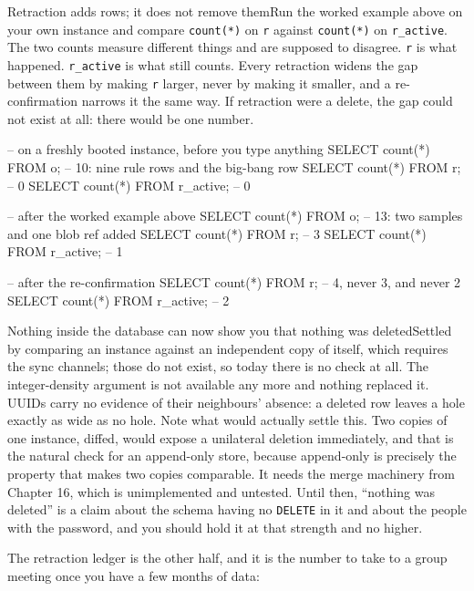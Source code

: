 \begin{Correspondence}{Retraction adds rows; it does not remove them}{Run the worked example above on your own instance and compare \texttt{count(*)} on \texttt{r} against \texttt{count(*)} on \texttt{r\_active}.}
The two counts measure different things and are supposed to disagree. \texttt{r} is what happened. \texttt{r\_active} is what still counts. Every retraction widens the gap between them by making \texttt{r} larger, never by making it smaller, and a re-confirmation narrows it the same way. If retraction were a delete, the gap could not exist at all: there would be one number.
\begin{Check}
-- on a freshly booted instance, before you type anything
SELECT count(*) FROM o;          -- 10: nine rule rows and the big-bang row
SELECT count(*) FROM r;          -- 0
SELECT count(*) FROM r_active;   -- 0

-- after the worked example above
SELECT count(*) FROM o;          -- 13: two samples and one blob ref added
SELECT count(*) FROM r;          -- 3
SELECT count(*) FROM r_active;   -- 1

-- after the re-confirmation
SELECT count(*) FROM r;          -- 4, never 3, and never 2
SELECT count(*) FROM r_active;   -- 2
\end{Check}
\end{Correspondence}

\begin{Open}{Nothing inside the database can now show you that nothing was deleted}{Settled by comparing an instance against an independent copy of itself, which requires the sync channels; those do not exist, so today there is no check at all.}
The integer-density argument is not available any more and nothing replaced it. UUIDs carry no evidence of their neighbours' absence: a deleted row leaves a hole exactly as wide as no hole. Note what would actually settle this. Two copies of one instance, diffed, would expose a unilateral deletion immediately, and that is the natural check for an append-only store, because append-only is precisely the property that makes two copies comparable. It needs the merge machinery from Chapter 16, which is unimplemented and untested. Until then, ``nothing was deleted'' is a claim about the schema having no \texttt{DELETE} in it and about the people with the password, and you should hold it at that strength and no higher.
\end{Open}

The retraction ledger is the other half, and it is the number to take to a group meeting once you have a few months of data:

